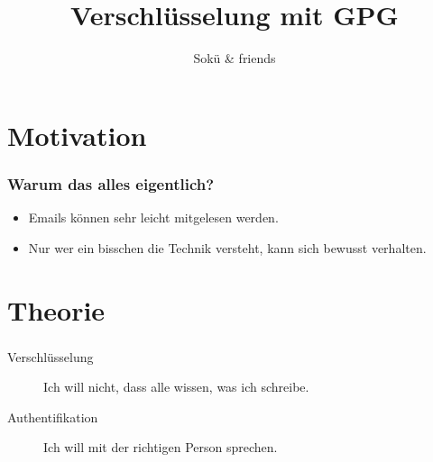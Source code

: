 \documentclass[compress]{beamer}
\begin{document}
\title{Verschlüsselung mit GPG}  
\author{Sokü \& friends}
\date{} 

\frame{\titlepage} 


\section{Motivation}
\label{sec:motivation}

\begin{frame}
  \frametitle{Warum das alles eigentlich?}

  \begin{itemize}[<+(1)->]
  \item Emails können sehr leicht mitgelesen werden.
  \item Nur wer ein bisschen die Technik versteht, kann sich bewusst
    verhalten.
  \end{itemize}
\end{frame}

\section{Theorie}
\label{sec:theorie}
\begin{frame}
    \frametitle{\insertsection}
    \begin{description}
        \item[Verschlüsselung] Ich will nicht, dass alle wissen, was ich schreibe.
        \item[Authentifikation] Ich will mit der richtigen Person sprechen.
    \end{description}
\end{frame}
\end{document}
